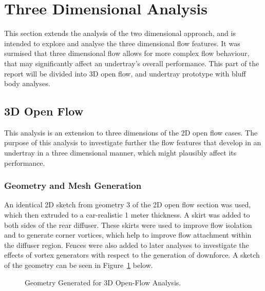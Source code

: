 \section{Three Dimensional Analysis}
\noindent This section extends the analysis of the two dimensional approach, and is intended to explore and analyse the  three dimensional flow features. It was surmised that three dimensional flow allows for more complex flow behaviour, that may significantly affect an undertray's overall performance. This part of the report will be divided into 3D open flow, and undertray prototype with bluff body analyses.

\subsection{3D Open Flow}
This analysis is an extension to three dimensions of the 2D open flow cases. The purpose of this analysis to investigate further the flow features that develop in an undertray in a three dimensional manner, which might plausibly affect its performance.

\subsubsection{Geometry and Mesh Generation}
An identical 2D sketch from geometry 3 of the 2D open flow section was used, which then extruded to a car-realistic 1 meter thickness. A skirt was added to both sides of the rear diffuser. These skirts were used to improve flow isolation and to generate corner vortices, which help to improve flow attachment within the diffuser region. Fences were also added to later analyses to investigate the effects of vortex generators with respect to the generation of downforce. A sketch of the geometry can be seen in Figure~\ref{fig:3D_OF_GEOM} below. 

\begin{figure}[!h]
    \centering
    \noindent{}
    \caption{Geometry Generated for 3D Open-Flow Analysis.}
    \label{fig:3D_OF_GEOM}
\end{figure}

